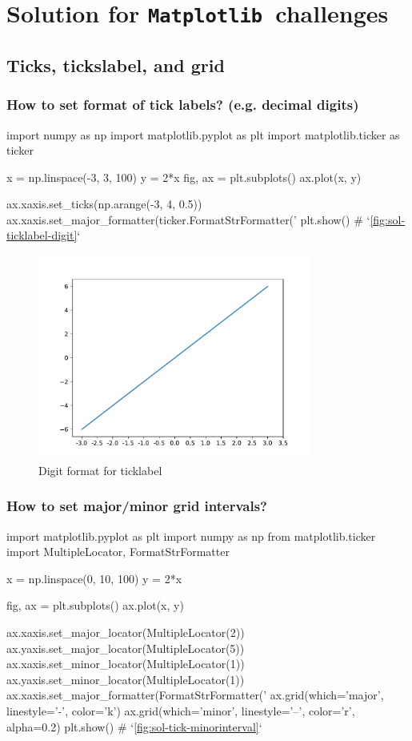 \documentclass{report}
\newcommand{\mpl}{\texttt{Matplotlib}}
\begin{document}
\chapter{Solution for \mpl\ challenges}
\section{Ticks, tickslabel, and grid}
\subsection{How to set format of tick labels? (e.g. decimal digits)}

\begin{py}
import numpy as np
import matplotlib.pyplot as plt
import matplotlib.ticker as ticker

x = np.linspace(-3, 3, 100)
y = 2*x
fig, ax = plt.subplots()
ax.plot(x, y)

ax.xaxis.set_ticks(np.arange(-3, 4, 0.5))
ax.xaxis.set_major_formatter(ticker.FormatStrFormatter('%
plt.show()  # `\autoref{fig:sol-ticklabel-digit}`
\end{py}

\begin{figure}[!htb]
  \centering
  \includegraphics[width=90mm]{sol-ticklabel-digit}
  \caption{Digit format for ticklabel}
  \label{fig:sol-ticklabel-digit}
\end{figure}

\subsection{How to set major/minor grid intervals?}
\begin{py}
import matplotlib.pyplot as plt
import numpy as np
from matplotlib.ticker import MultipleLocator, FormatStrFormatter

x = np.linspace(0, 10, 100)
y = 2*x

fig, ax = plt.subplots()
ax.plot(x, y)

ax.xaxis.set_major_locator(MultipleLocator(2))
ax.yaxis.set_major_locator(MultipleLocator(5))
ax.xaxis.set_minor_locator(MultipleLocator(1))
ax.yaxis.set_minor_locator(MultipleLocator(1))
ax.xaxis.set_major_formatter(FormatStrFormatter('%
ax.grid(which='major', linestyle='-', color='k')
ax.grid(which='minor', linestyle='--', color='r', alpha=0.2)
plt.show() # `\autoref{fig:sol-tick-minorinterval}`
\end{py}
\end{document}
